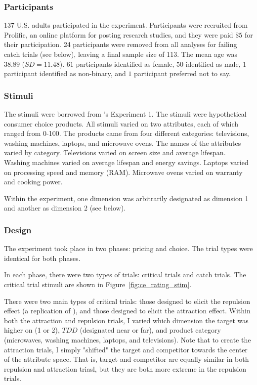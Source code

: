 \subsubsection{Participants}
137 U.S. adults participated in the experiment. Participants were recruited from Prolific, an online platform for posting research studies, and they were paid $\$5$ for their participation. 24 participants were removed from all analyses for failing catch trials (see below), leaving a final sample size of 113. The mean age was $38.89$ ($SD=11.48$). $61$ participants identified as female, $50$ identified as male, $1$ participant identified as non-binary, and $1$ participant preferred not to say.

\subsubsection{Stimuli}

The stimuli were borrowed from \textcite{banerjeeFactorsThatPromote2024}'s Experiment 1. The stimuli were hypothetical consumer choice products. All stimuli varied on two attributes, each of which ranged from 0-100. The products came from four different categories: televisions, washing machines, laptops, and microwave ovens. The names of the attributes varied by category. Televisions varied on screen size and average lifespan. Washing machines varied on average lifespan and energy savings. Laptops varied on processing speed and memory (RAM). Microwave ovens varied on warranty and cooking power. 

Within the experiment, one dimension was arbitrarily designated as dimension 1 and another as dimension 2 (see below). 

\subsubsection{Design}

The experiment took place in two phases: pricing and choice. The trial types were identical for both phases.

In each phase, there were two types of trials: critical trials and catch trials. The critical trial stimuli are shown in Figure~\ref{fig:ce_rating_stim}. 

There were two main types of critical trials: those designed to elicit the repulsion effect (a replication of \citeauthor{banerjeeFactorsThatPromote2024}), and those designed to elicit the attraction effect. Within both the attraction and repulsion trials, I varied which dimension the target was higher on (1 or 2), $TDD$ (designated near or far), and product category (microwaves, washing machines, laptops, and televisions). Note that to create the attraction trials, I simply "shifted" the target and competitor towards the center of the attribute space. That is, target and competitor are equally similar in both repulsion and attraction triasl, but they are both more extreme in the repulsion trials.

